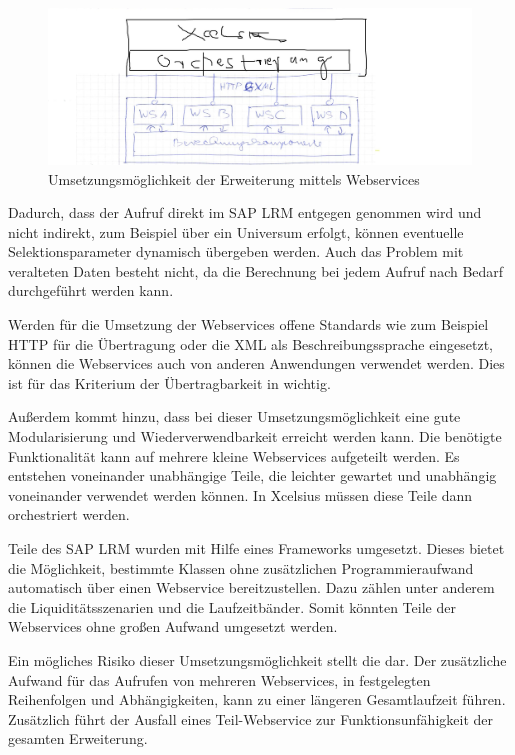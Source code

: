 \begin{onehalfspacing}
\begin{figure}[h]
\centering
\setlength{\unitlength}{1mm}
\includegraphics[width=15cm]{images/umsetzung_webservice.jpg}
\caption{Umsetzungsmöglichkeit der Erweiterung mittels Webservices \label{fig:umsetzung_webservice}}
\end{figure} 

Dadurch, dass der Aufruf direkt im SAP LRM entgegen genommen wird und nicht indirekt, zum Beispiel über ein Universum erfolgt, können eventuelle Selektionsparameter dynamisch übergeben werden. Auch das Problem mit veralteten Daten besteht nicht, da die Berechnung bei jedem Aufruf nach Bedarf durchgeführt werden kann.

Werden für die Umsetzung der Webservices offene Standards wie zum Beispiel \gls{HTTP} für die Übertragung oder die \gls{XML} als Beschreibungssprache eingesetzt, können die Webservices auch von anderen Anwendungen verwendet werden. Dies ist für das Kriterium der Übertragbarkeit in  wichtig.

Außerdem kommt hinzu, dass bei dieser Umsetzungsmöglichkeit eine gute Modularisierung und Wiederverwendbarkeit erreicht werden kann. Die benötigte Funktionalität kann auf mehrere kleine Webservices aufgeteilt werden. Es entstehen voneinander unabhängige Teile, die leichter gewartet und unabhängig voneinander verwendet werden können. In \gls{Xcelsius} müssen diese Teile dann orchestriert werden.

Teile des SAP LRM wurden mit Hilfe eines Frameworks umgesetzt. Dieses bietet die Möglichkeit, bestimmte Klassen ohne zusätzlichen Programmieraufwand automatisch über einen Webservice bereitzustellen. Dazu zählen unter anderem die Liquiditätsszenarien und die Laufzeitbänder. Somit könnten Teile der Webservices ohne großen Aufwand umgesetzt werden.

Ein mögliches Risiko dieser Umsetzungsmöglichkeit stellt die  dar. Der zusätzliche Aufwand für das Aufrufen von mehreren Webservices, in festgelegten Reihenfolgen und Abhängigkeiten, kann zu einer längeren Gesamtlaufzeit führen. Zusätzlich führt der Ausfall eines Teil-Webservice zur Funktionsunfähigkeit der gesamten Erweiterung.


\end{onehalfspacing}
